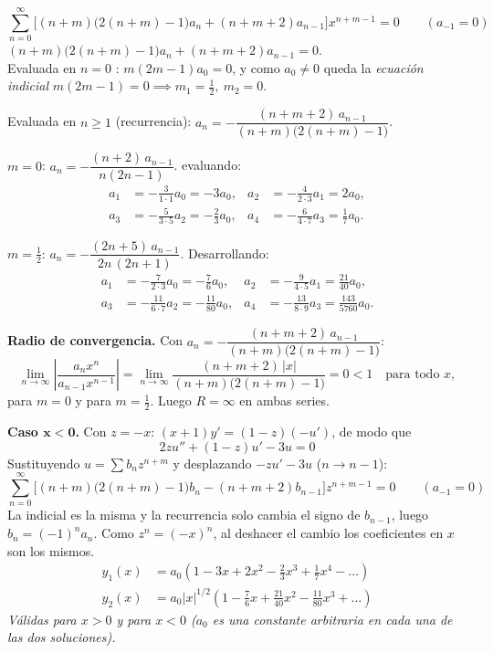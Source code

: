 \documentclass[11pt, a4paper]{article}
\begin{document}
\[
\sum_{n=0}^\infty\Big[(n+m)\big(2(n+m)-1\big)a_n+(n+m+2)a_{n-1}\Big]x^{n+m-1}=0 \qquad (a_{-1}=0)
\]
$(n+m)\big(2(n+m)-1\big)a_n+(n+m+2)a_{n-1}=0$.\\
\smallskip\noindent Evaluada en $n=0$ : $m(2m-1)a_0=0$, y como $a_0\neq0$ queda la \emph{ecuación indicial} $m(2m-1)=0 \implies m_1=\tfrac12,\ m_2=0$.

\smallskip\noindent Evaluada en $n\geq1$ (recurrencia): $a_n=-\dfrac{(n+m+2)\,a_{n-1}}{(n+m)\big(2(n+m)-1\big)}$.

\smallskip\noindent $m=0$: $a_n=-\dfrac{(n+2)\,a_{n-1}}{n(2n-1)}$. evaluando:
\begin{align*}
a_1&=-\frac{3}{1\cdot1}a_0=-3a_0, & a_2&=-\frac{4}{2\cdot3}a_1=2a_0, \\
a_3&=-\frac{5}{3\cdot5}a_2=-\frac23a_0, & a_4&=-\frac{6}{4\cdot7}a_3=\frac17a_0.
\end{align*}

\smallskip\noindent $m=\tfrac12$: $a_n=-\dfrac{(2n+5)\,a_{n-1}}{2n\,(2n+1)}$. Desarrollando:
\begin{align*}
a_1&=-\frac{7}{2\cdot3}a_0=-\frac76a_0, & a_2&=-\frac{9}{4\cdot5}a_1=\frac{21}{40}a_0, \\
a_3&=-\frac{11}{6\cdot7}a_2=-\frac{11}{80}a_0, & a_4&=-\frac{13}{8\cdot9}a_3=\frac{143}{5760}a_0.
\end{align*}

\smallskip\noindent\textbf{Radio de convergencia.} Con $a_n=-\dfrac{(n+m+2)\,a_{n-1}}{(n+m)\big(2(n+m)-1\big)}$:
\[
\lim_{n\to\infty}\left|\frac{a_{n}x^{n}}{a_{n-1}x^{n-1}}\right|=\lim_{n\to\infty}\frac{(n+m+2)\,|x|}{(n+m)\big(2(n+m)-1\big)}=0<1 \quad\text{para todo }x,
\]
para $m=0$ y para $m=\tfrac12$. Luego $R=\infty$ en ambas series.

\vspace{0.2cm}\noindent\textbf{Caso $\bm{x<0}$.} Con $z=-x$: $(x+1)y'=(1-z)(-u')$, de modo que
\[
2zu''+(1-z)u'-3u=0
\]
Sustituyendo $u=\sum b_nz^{n+m}$ y desplazando $-zu'-3u$ ($n\to n-1$):
\[
\sum_{n=0}^\infty\Big[(n+m)\big(2(n+m)-1\big)b_n-(n+m+2)b_{n-1}\Big]z^{n+m-1}=0 \qquad (a_{-1}=0)
\]
La indicial es la misma y la recurrencia solo cambia el signo de $b_{n-1}$, luego $b_n=(-1)^na_n$. Como $z^n=(-x)^n$, al deshacer el cambio los coeficientes en $x$ son los mismos.
\[
\boxed{\begin{aligned}
y_1(x)&=a_0\left(1-3x+2x^2-\frac23x^3+\frac17x^4-\dots\right) \\[2pt]
y_2(x)&=a_0|x|^{1/2}\left(1-\frac76x+\frac{21}{40}x^2-\frac{11}{80}x^3+\dots\right)
\end{aligned}}
\]
\textit{Válidas para $x>0$ y para $x<0$ ($a_0$ es una constante arbitraria en cada una de las dos soluciones).}
\end{document}
